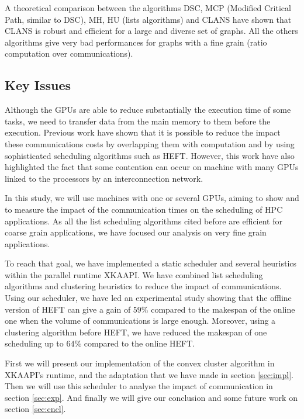 \documentclass[10pt, conference, compsocconf,pdftex,dvipsnames]{IEEEtran}
\begin{document}
A theoretical comparison\cite{khan1994comparison} between the algorithms DSC,
MCP (Modified Critical Path, similar to DSC), MH, HU (lists algorithms) and
CLANS have shown that CLANS is robust and efficient for a large and diverse
set of graphs. All the others algorithms give very bad performances for graphs
with a fine grain (ratio computation over communications). 

\subsection{Key Issues}

Although the GPUs are able to reduce substantially the execution time of
some tasks, we need to transfer data from the main memory to them before
the execution. Previous work\cite{ferreiralima:hal-00735470} have shown
that it is possible to reduce the impact these communications costs by
overlapping them with computation and by using sophisticated scheduling
algorithms such as HEFT.  However, this work have also highlighted the
fact that some contention can occur on machine with many GPUs linked to
the processors by an interconnection network.

In this study, we will use machines with one or several GPUs, aiming to
show and to measure the impact of the communication times on the
scheduling of HPC applications. As all the list scheduling algorithms cited
before are efficient for coarse grain applications, we have focused our
analysis on very fine grain applications. 

To reach that goal, we have implemented a static scheduler and several
heuristics within the parallel runtime XKAAPI. We have combined list
scheduling algorithms and clustering heuristics to reduce the impact of
communications. Using our scheduler, we have led an experimental study
showing that the offline version of HEFT can give a gain of $59\%$
compared to the makespan of the online one when the volume of
communications is large enough. Moreover, using a clustering algorithm
before HEFT, we have reduced the makespan of one scheduling up to $64\%$
compared to the online HEFT.

First we will present our implementation of the convex cluster algorithm in
XKAAPI's runtime, and the adaptation that we have made in section
\ref{sec:impl}. Then we will use this scheduler to analyse the impact of
communication in section \ref{sec:exp}. And finally we will give our
conclusion and some future work on section \ref{sec:cncl}.
\end{document}
